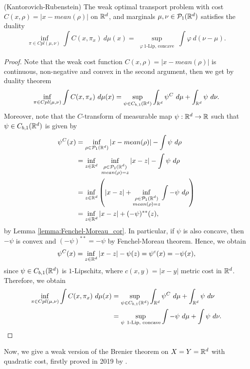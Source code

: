 \documentclass[../main.tex]{subfiles}
\begin{document}
\begin{theorem} (Kantorovich-Rubenstein) 
    The weak optimal transport problem with cost $C(x, \rho) = |x - mean(\rho)|$ on $\mathbb{R}^d$, and marginals $\mu, \nu\in\mathcal{P}_1(\mathbb{R}^d)$ satisfies the duality
    $$
    \inf_{\pi \in Cpl(\mu, \nu)} \int C(x, \pi_x) \ d\mu(x) = \sup_{\substack{\varphi \ 1\text{-Lip, concave}}} \int \varphi \ d(\nu - \mu). 
    $$
\end{theorem}
\begin{proof}
    Note that the weak cost function $C(x, \rho) = |x-mean(\rho)|$ is continuous, non-negative and convex in the second argument, then we get by duality theorem 
    $$
    \inf_{\pi \in Cpl(\mu, \nu)} \int C(x, \pi_x) \ d\mu(x)
    = \sup_{\psi\in C_{b,1}(\mathbb{R}^d)} \int_{\mathbb{R}^d} \psi^C \ d\mu + \int_{\mathbb{R}^d} \psi \ d\nu.
    $$
    Moreover, note that the $C$-transform of measurable map $\psi:\mathbb{R}^d\to\mathbb{R}$ such that $\psi\in C_{b,1}(\mathbb{R}^d)$ is given by
    \begin{align*}
        \psi^C(x) 
        &= \inf_{\rho\in \mathcal{P}_1(\R^d)} |x-mean(\rho)| - \int \psi \ d\rho \\
        &= \inf_{z\in\R^d} \ \inf_{\substack{\rho\in\mathcal{P}_1(\R^d) \\ mean(\rho)=z}} |x-z| - \int \psi \ d\rho \\
        &= \inf_{z\in\R^d} \left(|x-z| + \inf_{\substack{\rho\in\mathcal{P}_1(\R^d) \\ mean(\rho)=z}} \int -\psi \ d\rho\right) \\
        &= \inf_{z\in\R^d} |x-z| + (-\psi)^{**}(z),
    \end{align*}
    by Lemma \ref{lemma:Fenchel-Moreau_cor}. In particular, if $\psi$ is also concave, then $-\psi$ is convex and $(-\psi)^{**} = -\psi$ by Fenchel-Moreau theorem. Hence, we obtain 
    $$
    \psi^C(x) = \inf_{z\in\mathbb{R}^d} |x-z| -\psi(z) = \psi^c(x) = -\psi(x),
    $$
    since $\psi\in C_{b,1}(\mathbb{R}^d)$ is $1$-Lipschitz, where $c(x, y) = |x - y|$ metric cost in $\mathbb{R}^d$. Therefore, we obtain
    \begin{align*}
        \inf_{\pi \in Cpl(\mu, \nu)} \int C(x, \pi_x) \ d\mu(x)
        &= \sup_{\psi\in C_{b,1}(\mathbb{R}^d)} \int_{\mathbb{R}^d} \psi^C \ d\mu + \int_{\mathbb{R}^d} \psi \ d\nu \\
        &= \sup_{\substack{\psi \ 1\text{-Lip, concave}}} \int -\psi \ d\mu + \int \psi \ d\nu.
    \end{align*}
\end{proof}

Now, we give a weak version of the Brenier theorem on $X=Y=\mathbb{R}^d$ with quadratic cost, firstly proved in 2019 by \cite{backhoff2019existence}.
\end{document}
